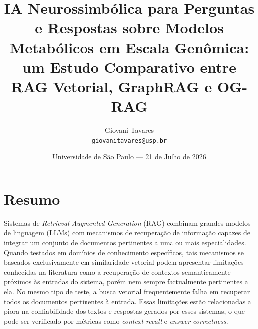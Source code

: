 \documentclass{article}
\title{IA Neurossimbólica para Perguntas e Respostas sobre Modelos Metabólicos em Escala Genômica: um Estudo Comparativo entre RAG Vetorial, GraphRAG e OG-RAG} %
\author{Giovani Tavares\\ \texttt{giovanitavares@usp.br}} %
\date{Universidade de São Paulo --- 21 de Julho de 2026} %
\begin{document}
	
	\maketitle %
	
	
	
	
	
	
	\section{Resumo}
	Sistemas de \textit{Retrieval-Augmented Generation} (RAG) combinam grandes modelos de linguagem (LLMs) com mecanismos de recuperação de informação capazes de integrar um conjunto de documentos pertinentes a uma ou mais especialidades. Quando testados em domínios de conhecimento específicos, tais mecanismos se baseados exclusivamente em similaridade vetorial podem apresentar limitações conhecidas na literatura como a recuperação de contextos semanticamente próximos às entradas do sistema, porém nem sempre factualmente pertinentes a ela.  No mesmo tipo de teste, a busca vetorial frequentemente falha em recuperar todos os documentos pertinentes à entrada. Essas limitações estão relacionadas a piora na confiabilidade dos textos e respostas gerados por esses sistemas, o que pode ser verificado por métricas como \textit{context recall} e \textit{answer correctness}.
	
\end{document}
